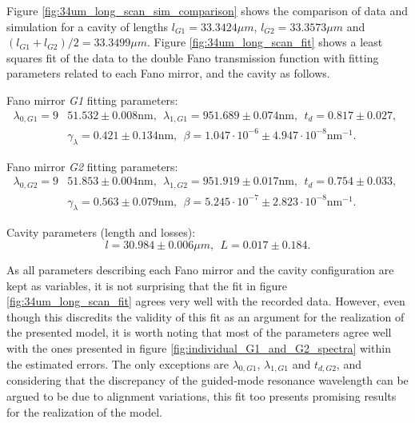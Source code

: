Figure \ref{fig:34um_long_scan_sim_comparison} shows the comparison of data and simulation for a cavity of lengths $l_{G1} = 33.3424 \mu m$, $l_{G2} = 33.3573 \mu m$ and $(l_{G1} + l_{G2})/2 = 33.3499 \mu m$. Figure \ref{fig:34um_long_scan_fit} shows a least squares fit of the data to the double Fano transmission function with fitting parameters related to each Fano mirror, and the cavity as follows.

Fano mirror \emph{G1} fitting parameters:
\begin{equation}
    \begin{split}
        \lambda_{0,G1} = 9&51.532 \pm 0.008 \text{nm}, \:\: \lambda_{1,G1} = 951.689 \pm 0.074 \text{nm}, \:\: t_d = 0.817 \pm 0.027, \:\: \\&\gamma_{\lambda} = 0.421 \pm 0.134 \text{nm}, \:\: \beta = 1.047 \cdot 10^{-6} \pm 4.947 \cdot 10^{-8} \text{nm}^{-1}.
    \end{split}
\end{equation}

Fano mirror \emph{G2} fitting parameters:
\begin{equation}
    \begin{split}
        \lambda_{0,G2} = 9&51.853 \pm 0.004 \text{nm}, \:\: \lambda_{1,G2} = 951.919 \pm 0.017 \text{nm}, \:\: t_d = 0.754 \pm 0.033, \:\: \\&\gamma_{\lambda} = 0.563 \pm 0.079 \text{nm}, \:\: \beta = 5.245 \cdot 10^{-7} \pm 2.823 \cdot 10^{-8} \text{nm}^{-1}.
    \end{split}
\end{equation}

Cavity parameters (length and losses):
\begin{equation}
    l = 30.984 \pm 0.006 \mu m, \:\: L = 0.017 \pm 0.184.
\end{equation}

As all parameters describing each Fano mirror and the cavity configuration are kept as variables, it is not surprising that the fit in figure \ref{fig:34um_long_scan_fit} agrees very well with the recorded data. However, even though this discredits the validity of this fit as an argument for the realization of the presented model, it is worth noting that most of the parameters agree well with the ones presented in figure \ref{fig:individual_G1_and_G2_spectra} within the estimated errors. The only exceptions are $\lambda_{0,G1}$, $\lambda_{1,G1}$ and $t_{d,G2}$, and considering that the discrepancy of the guided-mode resonance wavelength can be argued to be due to alignment variations, this fit too presents promising results for the realization of the model.

